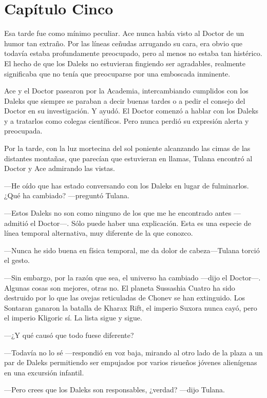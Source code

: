 \chapter*{Capítulo Cinco}

Esa tarde fue como mínimo peculiar. Ace nunca había visto al
Doctor de un humor tan extraño. Por las líneas ceñudas arrugando su
cara, era obvio que todavía estaba profundamente preocupado, pero al
menos no estaba tan histérico. El hecho de que los Daleks no estuvieran
fingiendo ser agradables, realmente significaba que no tenía que
preocuparse por una emboscada inminente.

Ace y el Doctor pasearon por la Academia, intercambiando
cumplidos con los Daleks que siempre se paraban a decir buenas tardes o
a pedir el consejo del Doctor en su investigación. Y ayudó. El Doctor
comenzó a hablar con los Daleks y a tratarlos como colegas científicos.
Pero nunca perdió su expresión alerta y preocupada.

Por la tarde, con la luz mortecina del sol poniente alcanzando
las cimas de las distantes montañas, que parecían que estuvieran en
llamas, Tulana encontró al Doctor y Ace admirando las vistas.

---He oído que has estado conversando con los Daleks en lugar de
fulminarlos. ¿Qué ha cambiado? ---preguntó Tulana.

---Estos Daleks no son como ninguno de los que me he encontrado
antes ---admitió el Doctor---. Sólo puede haber una explicación. Esta es
una especie de línea temporal alternativa, muy diferente de la que
conozco.

---Nunca he sido buena en física temporal, me da dolor de
cabeza---Tulana torció el gesto.

---Sin embargo, por la razón que sea, el universo ha cambiado
---dijo el Doctor---. Algunas cosas son mejores, otras no. El planeta
Sussashia Cuatro ha sido destruido por lo que las ovejas reticuladas de
Chonev se han extinguido. Los Sontaran ganaron la batalla de Kharax
Rift, el imperio Suxora nunca cayó, pero el imperio Kligoric sí. La
lista sigue y sigue.

---¿Y qué causó que todo fuese diferente?

---Todavía no lo sé ---respondió en voz baja, mirando al otro
lado de la plaza a un par de Daleks permitiendo ser empujados por varios
risueños jóvenes alienígenas en una excursión infantil.

---Pero crees que los Daleks son responsables, ¿verdad? ---dijo
Tulana.

